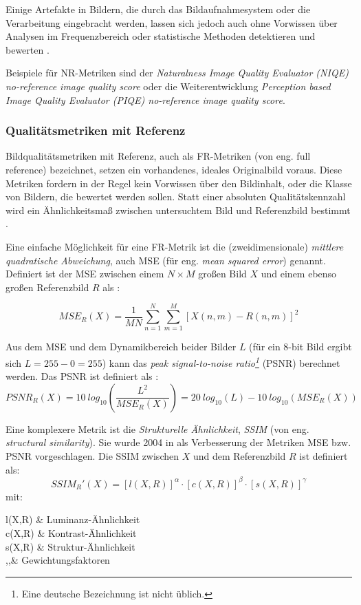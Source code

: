 Einige Artefakte in Bildern, die durch das Bildaufnahmesystem oder die Verarbeitung eingebracht werden, lassen sich jedoch auch ohne Vorwissen über Analysen im Frequenzbereich oder statistische Methoden detektieren und bewerten \cite[S.~86]{Wang2006}.

Beispiele für NR-Metriken sind der \textit{Naturalness Image Quality Evaluator (NIQE) no-reference image quality score}\cite{Mittal2013} oder die Weiterentwicklung \textit{Perception based Image Quality Evaluator (PIQE) no-reference image quality score}\cite{Venkatanath2015}.

\subsubsection{Qualitätsmetriken mit Referenz}
Bildqualitätsmetriken mit Referenz, auch als FR-Metriken (von eng. full reference) bezeichnet, setzen ein vorhandenes, ideales Originalbild voraus. Diese Metriken fordern in der Regel kein Vorwissen über den Bildinhalt, oder die Klasse von Bildern, die bewertet werden sollen. Statt einer absoluten Qualitätskennzahl wird ein Ähnlichkeitsmaß zwischen untersuchtem Bild und Referenzbild bestimmt \cite[S.~43]{Wang2006}.

Eine einfache Möglichkeit für eine FR-Metrik ist die (zweidimensionale) \textit{mittlere quadratische Abweichung}, auch MSE (für eng. \textit{mean squared error}) genannt. Definiert ist der MSE zwischen einem $N \times M$ großen Bild $X$ und einem ebenso großen Referenzbild $R$ als \cite{Tan2013}:

\begin{equation}
	MSE_R(X)=\frac{1}{M N} \sum_{n=1}^{N} \sum_{m=1}^{M} [X(n,m) - R(n,m)]^2
\end{equation}

Aus dem MSE und dem Dynamikbereich beider Bilder $L$ (für ein 8-bit Bild ergibt sich $L=255-0=255$) kann das \textit{peak signal-to-noise ratio\footnote{Eine deutsche Bezeichnung ist nicht üblich.}} (PSNR) berechnet werden. Das PSNR ist definiert als \cite{Bondzulic2016}:
\begin{equation}
	PSNR_R(X)= 10\: log_{10}\left(\frac{L^2}{MSE_R(X)}\right) = 20\: log_{10}(L) - 10\: log_{10}(MSE_R(X))
\end{equation}

Eine komplexere Metrik ist die \textit{Strukturelle Ähnlichkeit}, \textit{SSIM} (von eng. \textit{structural similarity}). Sie wurde 2004 in \cite{Wang2004} als Verbesserung der Metriken MSE bzw. PSNR vorgeschlagen. Die SSIM zwischen $X$ und dem Referenzbild $R$ ist definiert als:
\begin{equation}
	SSIM_R'(X)=[l(X,R)]^\alpha\cdot[c(X,R)]^\beta\cdot[s(X,R)]^\gamma
\end{equation}
mit:
\begin{with}
	l(X,R) & Luminanz-Ähnlichkeit\\
	c(X,R) & Kontrast-Ähnlichkeit\\
	s(X,R) & Struktur-Ähnlichkeit\\
	\alpha,\beta,\gamma & Gewichtungsfaktoren \\
\end{with}


